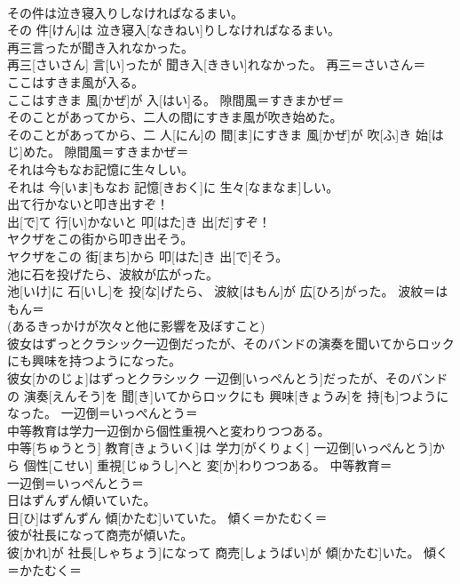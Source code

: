 \documentclass[8pt]{extreport}
\begin{document}
\begin{CJK}{UTF8}{min}
\\	その件は泣き寝入りしなければなるまい。	
\\	その 件[けん]は 泣き寝入[なきねい]りしなければなるまい。	
\\	再三言ったが聞き入れなかった。	
\\	再三[さいさん] 言[い]ったが 聞き入[ききい]れなかった。	再三＝さいさん＝ 
\\	ここはすきま風が入る。	
\\	ここはすきま 風[かぜ]が 入[はい]る。	隙間風＝すきまかぜ＝ 
\\	そのことがあってから、二人の間にすきま風が吹き始めた。	
\\	そのことがあってから、二 人[にん]の 間[ま]にすきま 風[かぜ]が 吹[ふ]き 始[はじ]めた。	隙間風＝すきまかぜ＝ 
\\	それは今もなお記憶に生々しい。	
\\	それは 今[いま]もなお 記憶[きおく]に 生々[なまなま]しい。	
\\	出て行かないと叩き出すぞ！	
\\	出[で]て 行[い]かないと 叩[はた]き 出[だ]すぞ！	
\\	ヤクザをこの街から叩き出そう。	
\\	ヤクザをこの 街[まち]から 叩[はた]き 出[で]そう。	
\\	池に石を投げたら、波紋が広がった。	
\\	池[いけ]に 石[いし]を 投[な]げたら、 波紋[はもん]が 広[ひろ]がった。	波紋＝はもん＝ 
\\	(あるきっかけが次々と他に影響を及ぼすこと) 
\\	彼女はずっとクラシック一辺倒だったが、そのバンドの演奏を聞いてからロックにも興味を持つようになった。	
\\	彼女[かのじょ]はずっとクラシック 一辺倒[いっぺんとう]だったが、そのバンドの 演奏[えんそう]を 聞[き]いてからロックにも 興味[きょうみ]を 持[も]つようになった。	一辺倒＝いっぺんとう＝ 
\\	中等教育は学力一辺倒から個性重視へと変わりつつある。	
\\	中等[ちゅうとう] 教育[きょういく]は 学力[がくりょく] 一辺倒[いっぺんとう]から 個性[こせい] 重視[じゅうし]へと 変[か]わりつつある。	中等教育＝ 
\\	一辺倒＝いっぺんとう＝ 
\\	日はずんずん傾いていた。	
\\	日[ひ]はずんずん 傾[かたむ]いていた。	傾く＝かたむく＝ 
\\	彼が社長になって商売が傾いた。	
\\	彼[かれ]が 社長[しゃちょう]になって 商売[しょうばい]が 傾[かたむ]いた。	傾く＝かたむく＝ 

\end{CJK}
\end{document}
